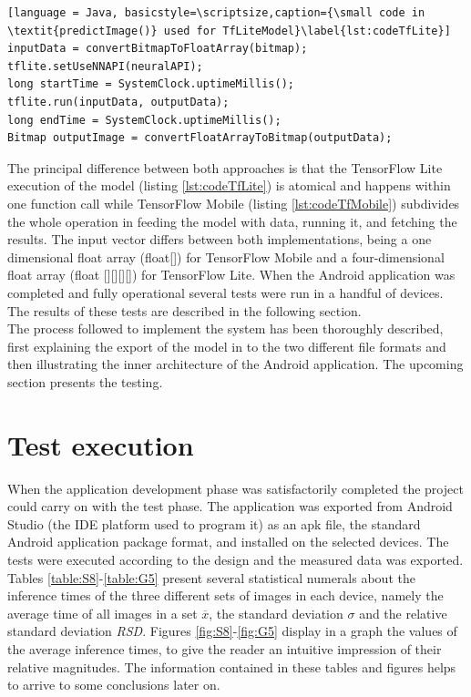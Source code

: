 \begin{lstlisting}[language = Java, basicstyle=\scriptsize,caption={\small code in \textit{predictImage()} used for TfLiteModel}\label{lst:codeTfLite}]
inputData = convertBitmapToFloatArray(bitmap);
tflite.setUseNNAPI(neuralAPI);
long startTime = SystemClock.uptimeMillis();
tflite.run(inputData, outputData);
long endTime = SystemClock.uptimeMillis();
Bitmap outputImage = convertFloatArrayToBitmap(outputData);
\end{lstlisting}

The principal difference between both approaches is that the TensorFlow Lite execution of the model (listing \ref{lst:codeTfLite}) is atomical and happens within one function call while TensorFlow Mobile (listing \ref{lst:codeTfMobile}) subdivides the whole operation in feeding the model with data, running it, and fetching the results. The input vector differs between both implementations, being a one dimensional float array (float[]) for TensorFlow Mobile and a four-dimensional float array (float [][][][]) for TensorFlow Lite.
When the Android application was completed and fully operational several tests were run in a handful of devices. The results of these tests are described in the following section. \\


The process followed to implement the system  has been thoroughly described, first explaining the export of the model in to the two different file formats and then illustrating the inner architecture of the Android application. The upcoming section presents the testing. \\

\newpage
\section{Test execution}
When the application development phase was satisfactorily completed the project could carry on with the test phase. The application was exported from Android Studio (the IDE platform used to program it) as an apk file, the standard Android application package format, and installed on the selected devices. The tests were executed according to the design and the measured data was exported. Tables \ref{table:S8}-\ref{table:G5} present several statistical numerals about the inference times of the three different sets of images in each device, namely the average time of all images in a set $\overline{x}$, the standard deviation $\sigma$ and the relative standard deviation \textit{RSD}. Figures \ref{fig:S8}-\ref{fig:G5} display in a graph the values of the average inference times, to give the reader an intuitive impression of their relative magnitudes. The information contained in these tables and figures helps to arrive to some conclusions later on.\\

